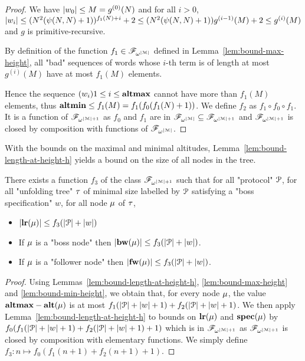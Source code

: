 \begin{proof}
	We have $|w_0| \leq M = g^{(0)}(N)$ and for all $i>0$, $|w_i| \leq (N^2(\psi(N,N)+1))^{f_1(N) + i} + 2 \leq (N^2(\psi(N,N)+1)) g^{(i-1)}(M) + 2 \leq g^{(i)}(M)$ and $g$ is primitive-recursive.
	
	By definition of the function $f_1 \in \mathscr{F}_{\omega^{|\mathcal{M}|}}$ defined in Lemma~\ref{lem:bound-max-height}, all "bad" sequences of words whose $i$-th term is of length at most $g^{(i)}(M)$ have at most $f_1(M)$ elements.
	
	Hence the sequence $(w_i){1\leq i \leq \mathbf{altmax}}$ cannot have more than $f_1(M)$ elements, thus $\mathbf{altmin} \leq f_1(M) = f_1(f_0(f_1(N)+1))$.
	We define $f_2$ as $f_1 \circ f_0 \circ f_1$. It is a function of $\mathscr{F}_{\omega^{|\mathcal{M}|+1}}$ as $f_0$ and $f_1$ are in $\mathscr{F}_{\omega^{|\mathcal{M}|}} \subseteq \mathscr{F}_{\omega^{|\mathcal{M}|+1}}$ and $\mathscr{F}_{\omega^{|\mathcal{M}|+1}}$ is closed by composition with functions of $\mathscr{F}_{\omega^{|\mathcal{M}|}}$.
\end{proof}

With the bounds on the maximal and minimal altitudes, Lemma~\ref{lem:bound-length-at-height-h} yields a bound on the size of all nodes in the tree.


\begin{lemma}
	\label{lem:bound-node-size}
	There exists a function $f_3$ of the class $\mathscr{F}_{\omega^{|\mathcal{M}|+1}}$ such that for all "protocol" $\mathcal{P}$, for all "unfolding tree" $\tau$ of minimal size labelled by $\mathcal{P}$ satisfying a "boss specification" $w$, for all node $\mu$ of $\tau$,
	
		\begin{itemize}
		\item $|\mathbf{lr}(\mu)| \leq f_3(|\mathcal{P}|+ |w|)$
			
		\item If $\mu$ is a "boss node" then $|\mathbf{bw}(\mu)| \leq f_3(|\mathcal{P}|+ |w|)$.
		
		\item If $\mu$ is a "follower node" then $|\mathbf{fw}(\mu)| \leq f_3(|\mathcal{P}|+ |w|)$.
	\end{itemize} 
\end{lemma}
\begin{proof}
	Using Lemmas~\ref{lem:bound-length-at-height-h}, \ref{lem:bound-max-height} and \ref{lem:bound-min-height}, we obtain that, for every node $\mu$, the value $\mathbf{altmax} - \mathbf{alt}(\mu)$ is at most $f_1(|\mathcal{P}| + |w| + 1) + f_2(|\mathcal{P}| + |w| +1)$. We then apply Lemma~\ref{lem:bound-length-at-height-h} to bounds on $\mathbf{lr}(\mu)$ and $\mathbf{spec}(\mu)$ by $f_0(f_1(|\mathcal{P}| + |w| + 1) + f_2(|\mathcal{P}| + |w| +1)+1)$ which is  in $\mathscr{F}_{\omega^{|\mathcal{M}|+1}}$ as $\mathscr{F}_{\omega^{|\mathcal{M}|+1}}$ is closed by composition with elementary functions. We simply define $f_3: n \mapsto f_0(f_1(n+1) + f_2(n+1)+1)$.
\end{proof}

